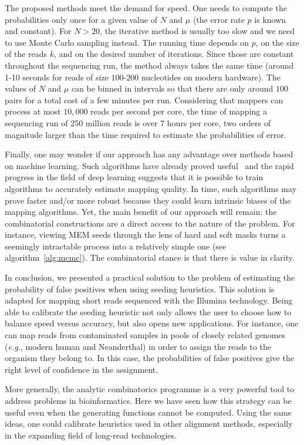 \documentclass{article}
\begin{document}
The proposed methods meet the demand for speed. One needs to compute the
probabilities only once for a given value of $N$ and $\mu$ (the error rate
$p$ is known and constant). For $N > 20$, the iterative method is usually
too slow and we need to use Monte Carlo sampling instead. The running
time depends on $p$, on the size of the reads $k$, and on the desired
number of iterations. Since those are constant throughout the sequencing
run, the method always takes the same time (around 1-10 seconds for reads
of size $100$-$200$ nucleotides on modern hardware). The values of $N$ and
$\mu$ can be binned in intervals so that there are only around $100$ pairs
for a total cost of a few minutes per run. Considering that mappers can
process at most $10,000$ reads per second per core, the time of mapping a
sequencing run of 250 million reads is over 7 hours per core, two orders
of magnitude larger than the time required to estimate the probabilities
of error.

Finally, one may wonder if our approach has any advantage over methods
based on machine learning. Such algorithms have already proved
useful~\cite{lee2014mosaik} and the rapid progress in the field of deep
learning suggests that it is possible to train algorithms to accurately
estimate mapping quality. In time, such algorithms may prove faster and/or
more robust because they could learn intrinsic biases of the mapping
algorithms. Yet, the main benefit of our approach will remain: the
combinatorial constructions are a direct access to the nature of the
problem. For instance, viewing MEM seeds through the lens of hard and soft
masks turns a seemingly intractable process into a relatively simple one
(see algorithm~\ref{alg:mcmc}). The combinatorial stance is that there is
value in clarity.

In conclusion, we presented a practical solution to the problem of
estimating the probability of false positives when using seeding
heuristics. This solution is adapted for mapping short reads sequenced
with the Illumina technology. Being able to calibrate the seeding
heuristic not only allows the user to choose how to balance speed versus
accuracy, but also opens new applications. For instance, one can map reads
from contaminated samples in pools of closely related genomes
(\textit{e.g.}, modern human and Neanderthal) in order to assign the reads
to the organism they belong to. In this case, the probabilities of false
positives give the right level of confidence in the assignment.

More generally, the analytic combinatorics programme is a very powerful
tool to address problems in bioinformatics. Here we have seen how this
strategy can be useful even when the generating functions cannot be
computed. Using the same ideas, one could calibrate heuristics used in
other alignment methods, especially in the expanding field of long-read
technologies.
\end{document}
